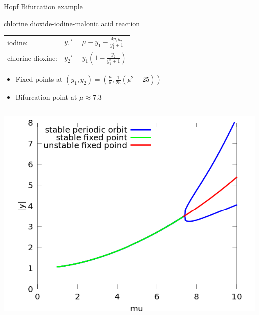 \documentclass{beamer}
\begin{document}
\begin{frame}[t]{Hopf Bifurcation example}
            \begin{exampleblock}{chlorine dioxide-iodine-malonic acid reaction}
                \begin{tabular}{l l}
                iodine: & $y_{1}' = \mu - y_{1} - \frac{4 y_{1} y_{2} }{ y_{1}^{2} + 1}$  \\
                chlorine dioxine: & $ y_{2}' = y_{1} (1 - \frac{y_{2}}{y_{1}^{2} + 1})$
                \end{tabular}
            \end{exampleblock}
            \begin{itemize}
                \item Fixed points at $(y_1, y_2) = (\frac{\mu}{5}, \frac{1}{25}(\mu^2 + 25) )$
                \item Bifurcation point at $\mu \approx 7.3$
            \end{itemize}
     \begin{columns}
         \includegraphics[width=1\textwidth]{grafik/myrhshopfEDIT.png}

\end{columns}
\end{frame}
\end{document}
